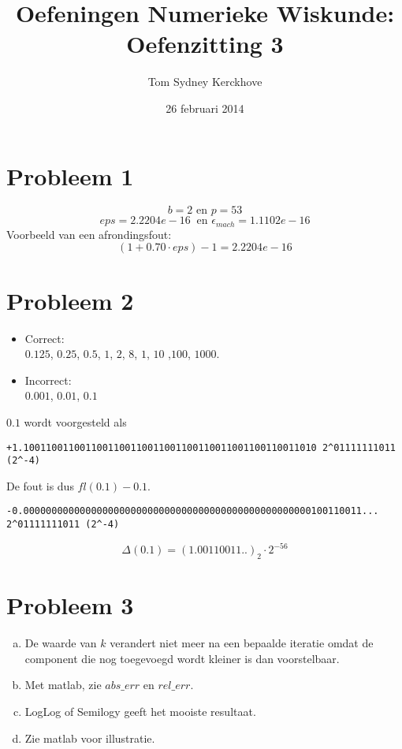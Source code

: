 \documentclass[12pt,a4paper]{article}
\author{Tom Sydney Kerckhove}
\title{Oefeningen Numerieke Wiskunde:\\ Oefenzitting 3}
\date{26 februari 2014}
\begin{document}
\maketitle

\section{Probleem 1}
\[
b = 2 \text{ en } p = 53
\]
\[
eps = 2.2204e-16\ \text{ en } \epsilon_{mach} = 1.1102e-16
\]
Voorbeeld van een afrondingsfout:
\[
(1+0.70\cdot eps) -1 = 2.2204e-16
\]

\section{Probleem 2}
\begin{itemize}
\item Correct:\\
$0.125$, $0.25$, $0.5$, $1$, $2$, $8$, $1$, $10$ ,$100$, $1000$.
\item Incorrect:\\
$0.001$, $0.01$, $0.1$
\end{itemize}
$0.1$ wordt voorgesteld als
{\scriptsize \begin{verbatim}
+1.1001100110011001100110011001100110011001100110011010 2^01111111011 (2^-4)
\end{verbatim}}
De fout is dus $fl(0.1)-0.1$.
{\scriptsize \begin{verbatim}
-0.000000000000000000000000000000000000000000000000000100110011...  2^01111111011 (2^-4)
\end{verbatim}}
\[
\Delta(0.1) = (1.00110011..)_{2} \cdot 2^{-56}
\]

\section{Probleem 3}
\begin{enumerate}[(a)]
\item
De waarde van $k$ verandert niet meer na een bepaalde iteratie omdat de component die nog toegevoegd wordt kleiner is dan voorstelbaar.

\item
Met matlab, zie $abs\_err$ en $rel\_err$.

\item
LogLog of Semilogy geeft het mooiste resultaat.

\item
Zie matlab voor illustratie.

\end{enumerate}
\end{document}
